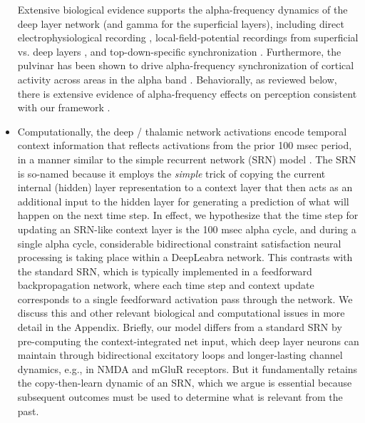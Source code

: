 \documentclass[11pt,twoside]{article}
\newif\myifpdf
\begin{document}
\begin{itemize}
Extensive biological evidence supports the alpha-frequency dynamics of the deep layer network (and gamma for the superficial layers), including direct electrophysiological recording \cite{LuczakBarthoHarris13}, local-field-potential recordings from superficial vs. deep layers \cite{BuffaloFriesLandmanEtAl11,MaierAdamsAuraEtAl10,MaierAuraLeopold11,SpaakBonnefondMaierEtAl12,XingYehBurnsEtAl12,BastosVezoliBosmanEtAl15,MichalareasVezolivanPeltEtAl16}, and top-down-specific synchronization \cite{vonSteinChiangKonig00,vanKerkoerleSelfDagninoEtAl14}.  Furthermore, the pulvinar has been shown to drive alpha-frequency synchronization of cortical activity across areas in the alpha band \cite{SaalmannPinskWangEtAl12}.  Behaviorally, as reviewed below, there is extensive evidence of alpha-frequency effects on perception consistent with our framework  \cite{NunnOsselton74,VarelaToroJohnEtAl81,VanRullenKoch03,JensenBonnefondVanRullen12}.

\item Computationally, the deep / thalamic network activations encode temporal context information that reflects activations from the prior 100 msec period, in a manner similar to the simple recurrent network (SRN) model \cite{Elman90,Elman91,Jordan89}.  The SRN is so-named because it employs the {\em simple} trick of copying the current internal (hidden) layer representation to a context layer that then acts as an additional input to the hidden layer for generating a prediction of what will happen on the next time step.  In effect, we hypothesize that the time step for updating an SRN-like context layer is the 100 msec alpha cycle, and during a single alpha cycle, considerable bidirectional constraint satisfaction neural processing is taking place within a DeepLeabra network.  This contrasts with the standard SRN, which is typically implemented in a feedforward backpropagation network, where each time step and context update corresponds to a single feedforward activation pass through the network.  We discuss this and other relevant biological and computational issues in more detail in the Appendix.  Briefly, our model differs from a standard SRN by pre-computing the context-integrated net input, which deep layer neurons can maintain through bidirectional excitatory loops and longer-lasting channel dynamics, e.g., in NMDA and mGluR receptors.  But it fundamentally retains the copy-then-learn dynamic of an SRN, which we argue is essential because subsequent outcomes must be used to determine what is relevant from the past.


\end{itemize}
\end{document}
